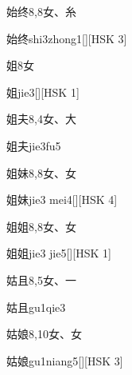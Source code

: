 \begin{entry}{始终}{8,8}{⼥、⽷}
  \begin{phonetics}{始终}{shi3zhong1}[][HSK 3]
  \end{phonetics}
\end{entry}

\begin{entry}{姐}{8}{⼥}
  \begin{phonetics}{姐}{jie3}[][HSK 1]
  \end{phonetics}
\end{entry}

\begin{entry}{姐夫}{8,4}{⼥、⼤}
  \begin{phonetics}{姐夫}{jie3fu5}
  \end{phonetics}
\end{entry}

\begin{entry}{姐妹}{8,8}{⼥、⼥}
  \begin{phonetics}{姐妹}{jie3 mei4}[][HSK 4]
  \end{phonetics}
\end{entry}

\begin{entry}{姐姐}{8,8}{⼥、⼥}
  \begin{phonetics}{姐姐}{jie3 jie5}[][HSK 1]
  \end{phonetics}
\end{entry}

\begin{entry}{姑且}{8,5}{⼥、⼀}
  \begin{phonetics}{姑且}{gu1qie3}
  \end{phonetics}
\end{entry}

\begin{entry}{姑娘}{8,10}{⼥、⼥}
  \begin{phonetics}{姑娘}{gu1niang5}[][HSK 3]
  \end{phonetics}
\end{entry}

